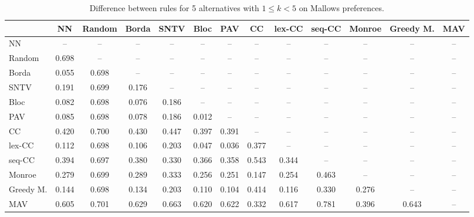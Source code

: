 
\begin{table*}[h!]
\centering
\begin{tabular}{lcccccccccccc}
\toprule
 & NN & Random & Borda & SNTV & Bloc & PAV & CC & lex-CC & seq-CC & Monroe & Greedy M. & MAV \\
\midrule
NN & -- & -- & -- & -- & -- & -- & -- & -- & -- & -- & -- & -- \\
Random & 0.698 & -- & -- & -- & -- & -- & -- & -- & -- & -- & -- & -- \\
Borda & 0.055 & 0.698 & -- & -- & -- & -- & -- & -- & -- & -- & -- & -- \\
SNTV & 0.191 & 0.699 & 0.176 & -- & -- & -- & -- & -- & -- & -- & -- & -- \\
Bloc & 0.082 & 0.698 & 0.076 & 0.186 & -- & -- & -- & -- & -- & -- & -- & -- \\
PAV & 0.085 & 0.698 & 0.078 & 0.186 & 0.012 & -- & -- & -- & -- & -- & -- & -- \\
CC & 0.420 & 0.700 & 0.430 & 0.447 & 0.397 & 0.391 & -- & -- & -- & -- & -- & -- \\
lex-CC & 0.112 & 0.698 & 0.106 & 0.203 & 0.047 & 0.036 & 0.377 & -- & -- & -- & -- & -- \\
seq-CC & 0.394 & 0.697 & 0.380 & 0.330 & 0.366 & 0.358 & 0.543 & 0.344 & -- & -- & -- & -- \\
Monroe & 0.279 & 0.699 & 0.289 & 0.333 & 0.256 & 0.251 & 0.147 & 0.254 & 0.463 & -- & -- & -- \\
Greedy M. & 0.144 & 0.698 & 0.134 & 0.203 & 0.110 & 0.104 & 0.414 & 0.116 & 0.330 & 0.276 & -- & -- \\
MAV & 0.605 & 0.701 & 0.629 & 0.663 & 0.620 & 0.622 & 0.332 & 0.617 & 0.781 & 0.396 & 0.643 & -- \\
\bottomrule
\end{tabular}

\caption{Difference between rules for 5 alternatives with $1 \leq k < 5$ on Mallows preferences.}
\end{table*}
